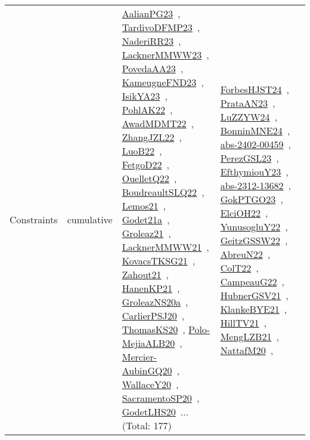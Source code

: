 {\begin{longtable}{lp{3cm}>{\raggedright\arraybackslash}p{6cm}>{\raggedright\arraybackslash}p{6cm}>{\raggedright\arraybackslash}p{8cm}}
Constraints & cumulative & \href{../works/AalianPG23.pdf}{AalianPG23}~\cite{AalianPG23}, \href{../works/TardivoDFMP23.pdf}{TardivoDFMP23}~\cite{TardivoDFMP23}, \href{../works/NaderiRR23.pdf}{NaderiRR23}~\cite{NaderiRR23}, \href{../works/LacknerMMWW23.pdf}{LacknerMMWW23}~\cite{LacknerMMWW23}, \href{../works/PovedaAA23.pdf}{PovedaAA23}~\cite{PovedaAA23}, \href{../works/KameugneFND23.pdf}{KameugneFND23}~\cite{KameugneFND23}, \href{../works/IsikYA23.pdf}{IsikYA23}~\cite{IsikYA23}, \href{../works/PohlAK22.pdf}{PohlAK22}~\cite{PohlAK22}, \href{../works/AwadMDMT22.pdf}{AwadMDMT22}~\cite{AwadMDMT22}, \href{../works/ZhangJZL22.pdf}{ZhangJZL22}~\cite{ZhangJZL22}, \href{../works/LuoB22.pdf}{LuoB22}~\cite{LuoB22}, \href{../works/FetgoD22.pdf}{FetgoD22}~\cite{FetgoD22}, \href{../works/OuelletQ22.pdf}{OuelletQ22}~\cite{OuelletQ22}, \href{../works/BoudreaultSLQ22.pdf}{BoudreaultSLQ22}~\cite{BoudreaultSLQ22}, \href{../works/Lemos21.pdf}{Lemos21}~\cite{Lemos21}, \href{../works/Godet21a.pdf}{Godet21a}~\cite{Godet21a}, \href{../works/Groleaz21.pdf}{Groleaz21}~\cite{Groleaz21}, \href{../works/LacknerMMWW21.pdf}{LacknerMMWW21}~\cite{LacknerMMWW21}, \href{../works/KovacsTKSG21.pdf}{KovacsTKSG21}~\cite{KovacsTKSG21}, \href{../works/Zahout21.pdf}{Zahout21}~\cite{Zahout21}, \href{../works/HanenKP21.pdf}{HanenKP21}~\cite{HanenKP21}, \href{../works/GroleazNS20a.pdf}{GroleazNS20a}~\cite{GroleazNS20a}, \href{../works/CarlierPSJ20.pdf}{CarlierPSJ20}~\cite{CarlierPSJ20}, \href{../works/ThomasKS20.pdf}{ThomasKS20}~\cite{ThomasKS20}, \href{../works/Polo-MejiaALB20.pdf}{Polo-MejiaALB20}~\cite{Polo-MejiaALB20}, \href{../works/Mercier-AubinGQ20.pdf}{Mercier-AubinGQ20}~\cite{Mercier-AubinGQ20}, \href{../works/WallaceY20.pdf}{WallaceY20}~\cite{WallaceY20}, \href{../works/SacramentoSP20.pdf}{SacramentoSP20}~\cite{SacramentoSP20}, \href{../works/GodetLHS20.pdf}{GodetLHS20}~\cite{GodetLHS20}... (Total: 177) & \href{../works/ForbesHJST24.pdf}{ForbesHJST24}~\cite{ForbesHJST24}, \href{../works/PrataAN23.pdf}{PrataAN23}~\cite{PrataAN23}, \href{../works/LuZZYW24.pdf}{LuZZYW24}~\cite{LuZZYW24}, \href{../works/BonninMNE24.pdf}{BonninMNE24}~\cite{BonninMNE24}, \href{../works/abs-2402-00459.pdf}{abs-2402-00459}~\cite{abs-2402-00459}, \href{../works/PerezGSL23.pdf}{PerezGSL23}~\cite{PerezGSL23}, \href{../works/EfthymiouY23.pdf}{EfthymiouY23}~\cite{EfthymiouY23}, \href{../works/abs-2312-13682.pdf}{abs-2312-13682}~\cite{abs-2312-13682}, \href{../works/GokPTGO23.pdf}{GokPTGO23}~\cite{GokPTGO23}, \href{../works/ElciOH22.pdf}{ElciOH22}~\cite{ElciOH22}, \href{../works/YunusogluY22.pdf}{YunusogluY22}~\cite{YunusogluY22}, \href{../works/GeitzGSSW22.pdf}{GeitzGSSW22}~\cite{GeitzGSSW22}, \href{../works/AbreuN22.pdf}{AbreuN22}~\cite{AbreuN22}, \href{../works/ColT22.pdf}{ColT22}~\cite{ColT22}, \href{../works/CampeauG22.pdf}{CampeauG22}~\cite{CampeauG22}, \href{../works/HubnerGSV21.pdf}{HubnerGSV21}~\cite{HubnerGSV21}, \href{../works/KlankeBYE21.pdf}{KlankeBYE21}~\cite{KlankeBYE21}, \href{../works/HillTV21.pdf}{HillTV21}~\cite{HillTV21}, \href{../works/MengLZB21.pdf}{MengLZB21}~\cite{MengLZB21}, \href{../works/NattafM20.pdf}{NattafM20}~\cite{NattafM20}, 
\end{longtable}}

